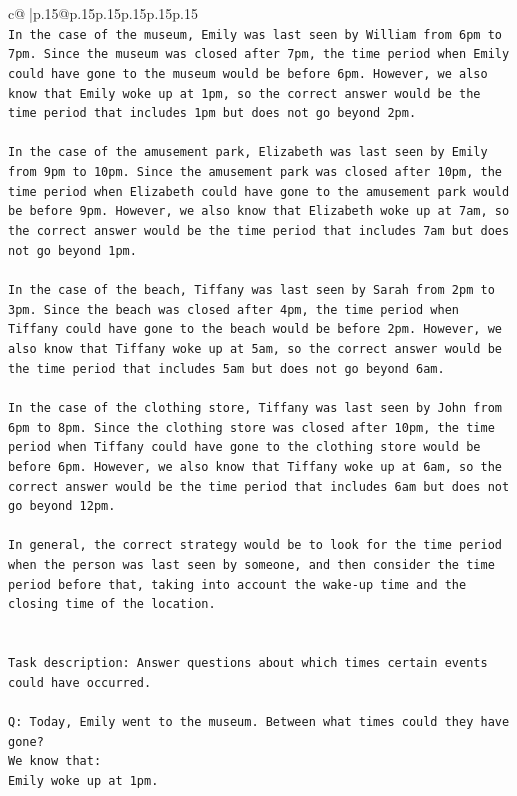 \documentclass{article}
\begin{document}
{\begin{supertabular}{c@{$\;$}|p{.15\linewidth}@{}p{.15\linewidth}p{.15\linewidth}p{.15\linewidth}p{.15\linewidth}p{.15\linewidth}}
{{{\\ 
\texttt{In the case of the museum, Emily was last seen by William from 6pm to 7pm. Since the museum was closed after 7pm, the time period when Emily could have gone to the museum would be before 6pm. However, we also know that Emily woke up at 1pm, so the correct answer would be the time period that includes 1pm but does not go beyond 2pm.} \\
\\ 
\texttt{In the case of the amusement park, Elizabeth was last seen by Emily from 9pm to 10pm. Since the amusement park was closed after 10pm, the time period when Elizabeth could have gone to the amusement park would be before 9pm. However, we also know that Elizabeth woke up at 7am, so the correct answer would be the time period that includes 7am but does not go beyond 1pm.} \\
\\ 
\texttt{In the case of the beach, Tiffany was last seen by Sarah from 2pm to 3pm. Since the beach was closed after 4pm, the time period when Tiffany could have gone to the beach would be before 2pm. However, we also know that Tiffany woke up at 5am, so the correct answer would be the time period that includes 5am but does not go beyond 6am.} \\
\\ 
\texttt{In the case of the clothing store, Tiffany was last seen by John from 6pm to 8pm. Since the clothing store was closed after 10pm, the time period when Tiffany could have gone to the clothing store would be before 6pm. However, we also know that Tiffany woke up at 6am, so the correct answer would be the time period that includes 6am but does not go beyond 12pm.} \\
\\ 
\texttt{In general, the correct strategy would be to look for the time period when the person was last seen by someone, and then consider the time period before that, taking into account the wake{-}up time and the closing time of the location.} \\
\\ 
\\ 
\texttt{Task description: Answer questions about which times certain events could have occurred.} \\
\\ 
\texttt{Q: Today, Emily went to the museum. Between what times could they have gone?} \\
\texttt{We know that:} \\
\texttt{Emily woke up at 1pm.} \\
}}}
\end{supertabular}}
\end{document}
